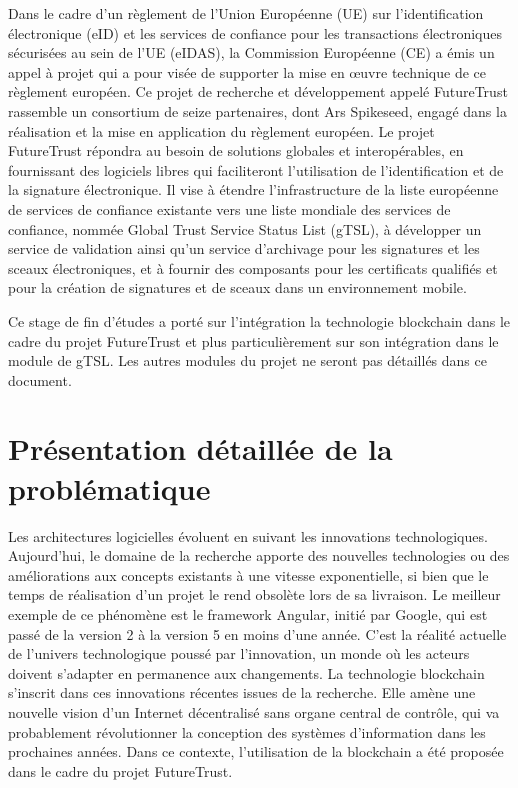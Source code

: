 \documentclass{tnreport}
\begin{document}
Dans le cadre d'un règlement de l'Union Européenne (UE) sur l'identification électronique (eID) et les services de confiance pour les transactions électroniques sécurisées au sein de l'UE (eIDAS), la Commission Européenne (CE) a émis un appel à projet qui a pour visée de supporter la mise en œuvre technique de ce règlement européen. 
Ce projet de recherche et développement appelé FutureTrust rassemble un consortium de seize partenaires, dont Ar{\texteta}s Spikeseed, engagé dans la réalisation et la mise en application du règlement européen. 
Le projet FutureTrust répondra au besoin de solutions globales et interopérables, en fournissant des logiciels libres qui faciliteront l'utilisation de l'identification et de la signature électronique. 
Il vise à étendre l'infrastructure de la liste européenne de services de confiance existante vers une liste mondiale des services de confiance, nommée Global Trust Service Status List (gTSL), à développer un service de validation ainsi qu'un service d'archivage pour les signatures et les sceaux électroniques, et à fournir des composants pour les certificats qualifiés et pour la création de signatures et de sceaux dans un environnement mobile.

Ce stage de fin d'études a porté sur l'intégration la technologie blockchain dans le cadre du projet FutureTrust et plus particulièrement sur son intégration dans le module de gTSL. Les autres modules du projet ne seront pas détaillés dans ce document. 

\chapter{Présentation détaillée de la problématique}

Les architectures logicielles évoluent en suivant les innovations technologiques. Aujourd'hui, le domaine de la recherche apporte des nouvelles technologies ou des améliorations aux concepts existants à une vitesse exponentielle, si bien que 
le temps de réalisation d'un projet le rend obsolète lors de sa livraison.
Le meilleur exemple de ce phénomène est le framework Angular, initié par Google, qui est passé de la version 2 à la version 5 en moins d'une année. C'est la réalité actuelle de l'univers technologique poussé par l'innovation, un monde où les acteurs doivent s'adapter en permanence aux changements. La technologie blockchain s'inscrit dans ces innovations récentes issues de la recherche. Elle amène une nouvelle vision d'un Internet décentralisé sans organe central de contrôle, qui va probablement révolutionner la conception des systèmes d'information dans les prochaines années. Dans ce contexte, l'utilisation de la blockchain a été proposée dans le cadre du projet FutureTrust.
\end{document}
